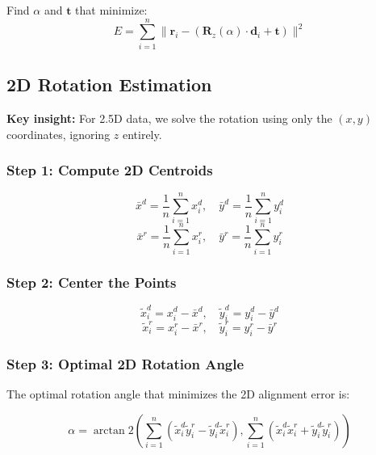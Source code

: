 \documentclass[11pt,a4paper]{article}
\begin{document}
Find $\alpha$ and $\mathbf{t}$ that minimize:
\begin{equation}
E = \sum_{i=1}^n \|\mathbf{r}_i - (\mathbf{R}_z(\alpha) \cdot \mathbf{d}_i + \mathbf{t})\|^2
\end{equation}

\subsection{2D Rotation Estimation}

\textbf{Key insight:} For 2.5D data, we solve the rotation using only the $(x,y)$ coordinates, ignoring $z$ entirely.

\subsubsection{Step 1: Compute 2D Centroids}

\begin{equation}
\bar{x}^d = \frac{1}{n}\sum_{i=1}^n x_i^d, \quad \bar{y}^d = \frac{1}{n}\sum_{i=1}^n y_i^d
\end{equation}
\begin{equation}
\bar{x}^r = \frac{1}{n}\sum_{i=1}^n x_i^r, \quad \bar{y}^r = \frac{1}{n}\sum_{i=1}^n y_i^r
\end{equation}

\subsubsection{Step 2: Center the Points}

\begin{equation}
\tilde{x}_i^d = x_i^d - \bar{x}^d, \quad \tilde{y}_i^d = y_i^d - \bar{y}^d
\end{equation}
\begin{equation}
\tilde{x}_i^r = x_i^r - \bar{x}^r, \quad \tilde{y}_i^r = y_i^r - \bar{y}^r
\end{equation}

\subsubsection{Step 3: Optimal 2D Rotation Angle}

The optimal rotation angle that minimizes the 2D alignment error is:

\begin{equation}
\boxed{\alpha = \arctan2\left(\sum_{i=1}^n (\tilde{x}_i^d \tilde{y}_i^r - \tilde{y}_i^d \tilde{x}_i^r), \sum_{i=1}^n (\tilde{x}_i^d \tilde{x}_i^r + \tilde{y}_i^d \tilde{y}_i^r)\right)}
\label{eq:2d_rotation}
\end{equation}
\end{document}
